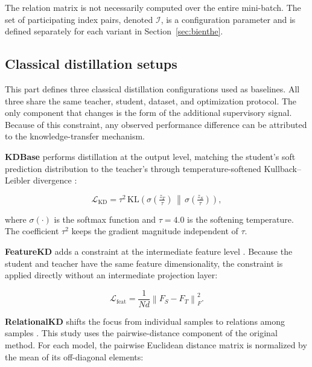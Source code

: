 The relation matrix is not necessarily computed over the entire
mini-batch. The set of participating index pairs, denoted
$\mathcal{I}$, is a configuration parameter and is defined
separately for each variant in Section~\ref{sec:bienthe}.

\subsection{Classical distillation setups}
\label{sec:cocdien}

This part defines three classical distillation configurations used
as baselines. All three share the same teacher, student, dataset,
and optimization protocol. The only component that changes is the
form of the additional supervisory signal. Because of this
constraint, any observed performance difference can be attributed to
the knowledge-transfer mechanism.

\textbf{KDBase} performs distillation at the output level, matching
the student's soft prediction distribution to the teacher's through
temperature-softened Kullback--Leibler divergence
\cite{hinton2015distilling}:

\begin{equation}
\label{eq:kd}
\mathcal{L}_{\mathrm{KD}} = \tau^{2}\,
  \mathrm{KL}\!\left(
  \sigma\!\left(\tfrac{z_T}{\tau}\right) \,\middle\|\,
  \sigma\!\left(\tfrac{z_S}{\tau}\right)\right),
\end{equation}

where $\sigma(\cdot)$ is the softmax function and $\tau = 4.0$ is the
softening temperature. The coefficient $\tau^{2}$ keeps the gradient
magnitude independent of $\tau$.

\textbf{FeatureKD} adds a constraint at the intermediate feature
level \cite{romero2015fitnets}. Because the student and teacher have
the same feature dimensionality, the constraint is applied directly
without an intermediate projection layer:

\begin{equation}
\label{eq:feat}
\mathcal{L}_{\mathrm{feat}} = \frac{1}{Nd}
  \left\| F_S - F_T \right\|_{F}^{2}.
\end{equation}

\textbf{RelationalKD} shifts the focus from individual samples to
relations among samples \cite{park2019relational}. This study uses
the pairwise-distance component of the original method. For each
model, the pairwise Euclidean distance matrix is normalized by the
mean of its off-diagonal elements:

